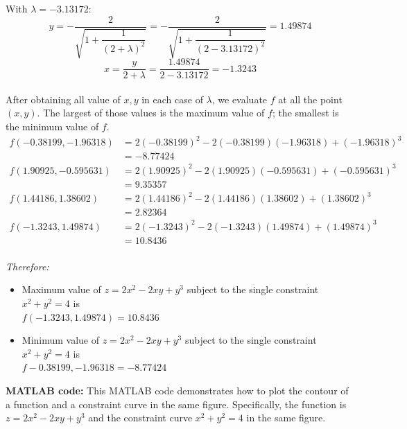 With $\lambda =-3.13172$: 
$$ y = -\dfrac{2}{ \sqrt{1 + \dfrac{1}{(2 + \lambda)^2}} } = -\dfrac{2}{ \sqrt{1 + \dfrac{1}{(2 -3.13172)^2}} } = 1.49874$$
$$ x = \dfrac{y}{2 + \lambda} = \dfrac{1.49874}{2 -3.13172} = -1.3243 $$\\[6pt]
After obtaining all value of $x, y$ in each case of $\lambda$, we evaluate $f$ at all the point $(x,y)$. The largest of those values is the maximum value of $f$; the smallest is the minimum value of $f$.
\begin{align*}
  f(-0.38199,-1.96318)
    &=2(-0.38199)^2-2(-0.38199)(-1.96318)+(-1.96318)^3\\
    &=-8.77424\\[6pt]
  f(1.90925,-0.595631)
    &=2(1.90925)^2-2(1.90925)(-0.595631)+(-0.595631)^3\\
    &=9.35357\\[6pt]
  f(1.44186,1.38602)
    &=2(1.44186 )^2-2(1.44186 )(1.38602)+(1.38602)^3\\
    &=2.82364\\[6pt]
  f(-1.3243,1.49874)
    &=2(-1.3243 )^2-2(-1.3243 )(1.49874)+(1.49874)^3\\
    &=10.8436\\[6pt]
\end{align*}

\textit{Therefore: }
\begin{itemize}
  \item Maximum value of $z = 2x^2 - 2xy + y^3$ subject to the single constraint $x^2 + y^2 = 4$ is \\
        $f(-1.3243,1.49874) = 10.8436$
  \item Minimum value of $z = 2x^2 - 2xy + y^3$ subject to the single constraint $x^2 + y^2 = 4$ is \\
        $f-0.38199,-1.96318=-8.77424$
\end{itemize}

\textbf{MATLAB code: }
This MATLAB code demonstrates how to plot the contour of a function and a constraint curve in the same figure. Specifically, the function is $z = 2x^2-2xy+y^3$ and the constraint curve $x^2 + y^2 = 4$ in the same figure.


